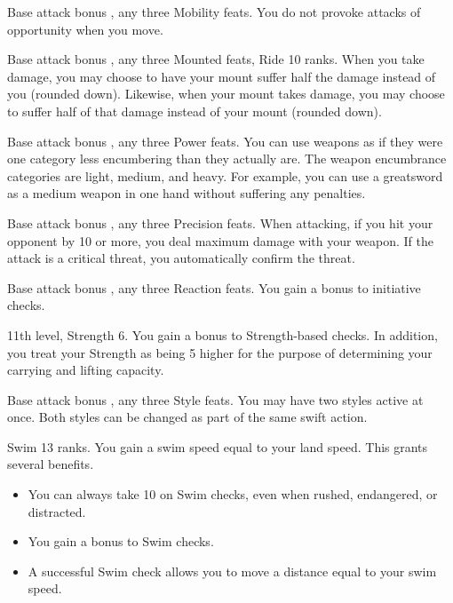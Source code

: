 \featpre Base attack bonus , any three Mobility feats.
\featben You do not provoke attacks of opportunity when you move.

\featpre Base attack bonus , any three Mounted feats, Ride 10 ranks.
\featben When you take damage, you may choose to have your mount suffer half the damage instead of you (rounded down). Likewise, when your mount takes damage, you may choose to suffer half of that damage instead of your mount (rounded down).

\featpres Base attack bonus , any three Power feats.
\featben You can use weapons as if they were one category less encumbering than they actually are. The weapon encumbrance categories are light, medium, and heavy. For example, you can use a greatsword as a medium weapon in one hand without suffering any penalties.

\featpre Base attack bonus , any three Precision feats.
\featben When attacking, if you hit your opponent by 10 or more, you deal maximum damage with your weapon. If the attack is a critical threat, you automatically confirm the threat.

\featpre Base attack bonus , any three Reaction feats.
\featben You gain a  bonus to initiative checks.

\featpre 11th level, Strength 6.
\featben You gain a  bonus to Strength-based checks. In addition, you treat your Strength as being 5 higher for the purpose of determining your carrying and lifting capacity.

\featpre Base attack bonus , any three Style feats.
\featben You may have two styles active at once. Both styles can be changed as part of the same swift action.

\featpre Swim 13 ranks.
\featben You gain a swim speed equal to your land speed. This grants several benefits.
\begin{itemize}
    \item You can always take 10 on Swim checks, even when rushed, endangered, or distracted.
    \item You gain a  bonus to Swim checks.
    \item A successful Swim check allows you to move a distance equal to your swim speed.
\end{itemize}

